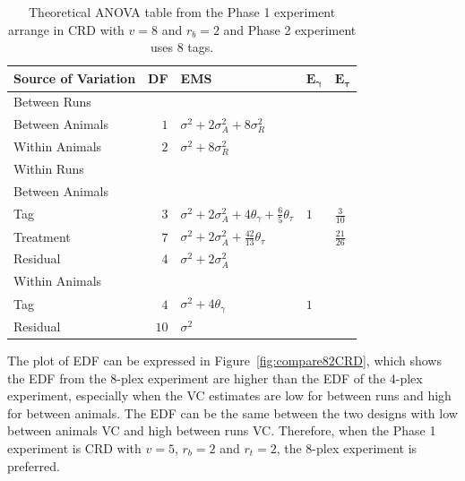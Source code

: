 \documentclass[12pt,a4paper]{article}
\begin{document}
\begin{table}[ht]
\centering
 \caption{Theoretical ANOVA table from the Phase 1 experiment arrange in CRD with $v = 8$ and $r_b = 2$ and Phase 2 experiment uses 8 tags.}
 \begin{tabular}[t]{lrlll} 
 \toprule 
 \multicolumn{1}{l}{\textbf{Source of Variation}} & \multicolumn{1}{l}{\textbf{DF}} & \multicolumn{1}{l}{\textbf{EMS}}& \multicolumn{1}{l}{$\bm{E_{\gamma}}$}&\multicolumn{1}{l}{$\bm{E_{\tau}}$}\\ 
 \midrule 
 Between Runs &  &  & & \\ 
 \quad Between Animals & $1$ & $\sigma^2+2\sigma_{A}^2+8\sigma_{R}^2$ & & \\ 
 \quad Within Animals & $2$ & $\sigma^2+8\sigma_{R}^2$ & & \\ \hline 
 Within Runs &  &  & & \\ 
 \quad Between Animals &  &  & & \\ 
 \quad \quad Tag & $3$ & $\sigma^2+2\sigma_{A}^2+4\theta_{\gamma}+\frac{6}{5}\theta_{\tau}$ &$1$ & $\frac{3}{10}$\\ 
 \quad \quad Treatment & $7$ & $\sigma^2+2\sigma_{A}^2+\frac{42}{13}\theta_{\tau}$ & & $\frac{21}{26}$\\ 
 \quad \quad Residual & $4$ & $\sigma^2+2\sigma_{A}^2$ & & \\ \hline 
 \quad Within Animals &  &  & & \\ 
 \quad \quad Tag & $4$ & $\sigma^2+4\theta_{\gamma}$ &$1$ & \\ 
 \quad \quad Residual & $10$ & $\sigma^2$ & & \\ 
 \bottomrule 
 \end{tabular} 
 \label{tab:ANOVAPhaseCRD32} 
\end{table} 

The plot of EDF can be expressed in Figure~\ref{fig:compare82CRD}, which shows the EDF from the 8-plex experiment are higher than the EDF of the 4-plex experiment, especially when the VC estimates are low for between runs and high for between animals. The EDF can be the same between the two designs with low between animals VC and high between runs VC. Therefore, when the Phase 1 experiment is CRD with $v = 5$, $r_b = 2$ and $r_t = 2$, the 8-plex experiment is preferred.
\end{document}
